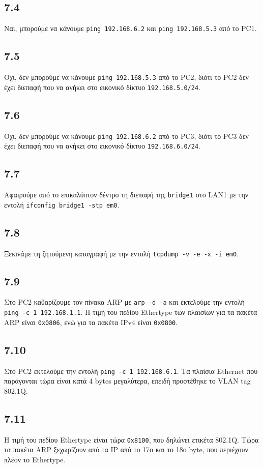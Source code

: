 \documentclass[a4paper, 12pt]{article}
\begin{document}
	\subsection*{7.4}
		Ναι, μπορούμε να κάνουμε \verb|ping 192.168.6.2| και \verb|ping 192.168.5.3| από το PC1.

	\subsection*{7.5}
		Όχι, δεν μπορούμε να κάνουμε \verb|ping 192.168.5.3| από το PC2, διότι το PC2 δεν έχει διεπαφή που να ανήκει στο εικονικό δίκτυο \verb|192.168.5.0/24|. 

	\subsection*{7.6}
		Όχι, δεν μπορούμε να κάνουμε \verb|ping 192.168.6.2| από το PC3, διότι το PC3 δεν έχει διεπαφή που να ανήκει στο εικονικό δίκτυο \verb|192.168.6.0/24|.

	\subsection*{7.7}
		Αφαιρούμε από το επικαλύπτον δέντρο τη διεπαφή της \verb|bridge1| στο LAN1 με την εντολή \verb|ifconfig bridge1 -stp em0|.

	\subsection*{7.8}
		Ξεκινάμε τη ζητούμενη καταγραφή με την εντολή \verb|tcpdump -v -e -x -i em0|.

	\subsection*{7.9}
		Στο PC2 καθαρίζουμε τον πίνακα ARP με \verb|arp -d -a| και εκτελούμε την εντολή \verb|ping -c 1 192.168.1.1|. Η τιμή του πεδίου Ethertype των πλαισίων για τα πακέτα ARP είναι \verb|0x0806|, ενώ για τα πακέτα IPv4 είναι \verb|0x0800|. 

	\subsection*{7.10}
		Στο PC2 εκτελούμε την εντολή \verb|ping -c 1 192.168.6.1|. Τα πλαίσια Ethernet που παράγονται τώρα είναι κατά 4 bytes μεγαλύτερα, επειδή προστέθηκε το VLAN tag 802.1Q.  

	\subsection*{7.11}
		Η τιμή του πεδίου Ethertype είναι τώρα \verb|0x8100|, που δηλώνει ετικέτα 802.1Q. Τώρα τα πακέτα ARP ξεχωρίζουν από τα IP από το 17ο και το 18ο byte, που περιέχουν πλέον το Ethertype. 
\end{document}
